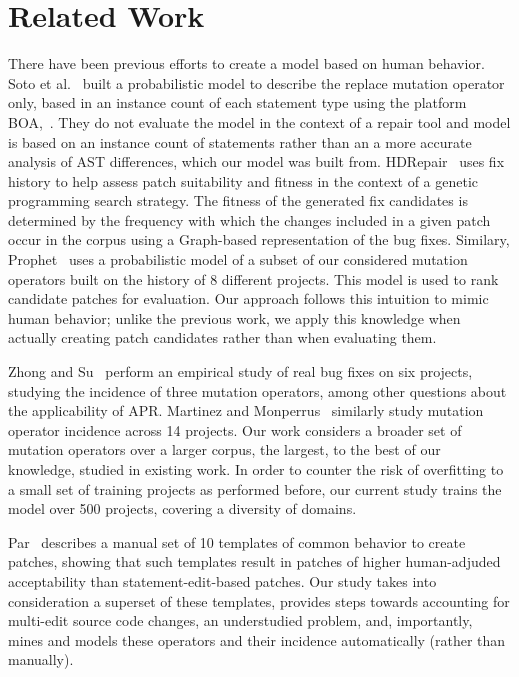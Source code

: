 \documentclass[conference]{IEEEtran}
\begin{document}
\section{Related Work} \label{relatedWork}

There have been previous efforts to create a model based on human behavior.  Soto et al.~\cite{Soto15} 
built a probabilistic model to describe the replace mutation 
operator only, based in 
an instance count of each statement type using the platform 
BOA,~\cite{dyer2013}.  They do not evaluate the model in the context of a repair
tool and model is based on an instance count of statements rather than an a more accurate analysis of AST differences, which our model was built from.  
HDRepair~\cite{xuan16} 
uses fix history
to help assess patch suitability and fitness in the context of a genetic
programming search strategy. The fitness of the generated
fix candidates is determined by the frequency with which the changes included in
a given patch occur in the corpus using a Graph-based representation of the bug
fixes.  Similary, Prophet~\cite{long16proph} uses a
probabilistic model of a subset of our considered mutation operators built on 
the history of 8 different projects. This model is used to rank candidate
patches for evaluation.  Our approach follows this intuition to mimic human
behavior; unlike the previous work, we apply this knowledge when actually
creating patch candidates rather than when evaluating them.  

Zhong and Su~\cite{zhong15} perform an empirical study of
real bug fixes on six projects, studying the incidence of three mutation
operators, among other questions about the applicability of APR.  Martinez and
Monperrus~\cite{martinez15} similarly study mutation operator incidence across 14 
projects. Our work considers a broader set of
mutation operators over a larger corpus, the largest, to the best of our
knowledge, studied in existing work. In 
order to counter the 
risk of overfitting to a small set of training projects as performed before, our 
current study trains the model over 500 projects, covering a diversity 
of domains.

Par~\cite{kim2013} describes a manual set of 10 templates of common behavior to
create patches, showing that such templates result in patches of higher
human-adjuded acceptability than statement-edit-based patches.  Our study takes into consideration a superset
of these templates, provides steps towards
accounting for multi-edit source code changes, an understudied problem, and,
importantly, mines and models these operators and their incidence automatically
(rather than manually).
\end{document}
